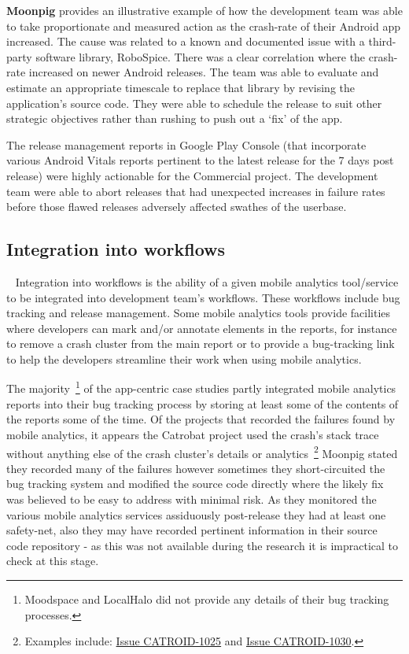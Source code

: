 \textbf{Moonpig} provides an illustrative example of how the development team was able to take proportionate and measured action as the crash-rate of their Android app increased. The cause was related to a known and documented issue with a third-party software library, RoboSpice. There was a clear correlation where the crash-rate increased on newer Android releases. The team was able to evaluate and estimate an appropriate timescale to replace that library by revising the application's source code. They were able to schedule the release to suit other strategic objectives rather than rushing to push out a `fix' of the app.

The release management reports in Google Play Console (that incorporate various Android Vitals reports pertinent to the latest release for the 7 days post release) were highly actionable for the Commercial project. The development team were able to abort releases that had unexpected increases in failure rates before those flawed releases adversely affected swathes of the userbase.

\subsection{Integration into workflows}~\label{section-integration-into-workflows}
Integration into workflows is the ability of a given mobile analytics tool/service to be integrated into development team's workflows. These workflows include bug tracking and release management. Some mobile analytics tools provide facilities where developers can mark and/or annotate elements in the reports, for instance to remove a crash cluster from the main report or to provide a bug-tracking link to help the developers streamline their work when using mobile analytics.

The 
majority~\footnote{Moodspace and LocalHalo did not provide any details of their bug tracking processes.} of the app-centric case studies partly integrated mobile analytics reports into their bug tracking process by storing at least some of the contents of the reports some of the time.  
Of the projects that recorded the failures found by mobile analytics, it appears the Catrobat project used the crash's stack trace without anything else of the crash cluster's details or analytics~\footnote{Examples include: \href{https://jira.catrob.at/browse/CATROID-1025}{Issue CATROID-1025} and \href{https://jira.catrob.at/browse/CATROID-1030}{Issue CATROID-1030}.} Moonpig stated they recorded many of the failures however sometimes they short-circuited the bug tracking system and modified the source code directly where the likely fix was believed to be easy to address with minimal risk. As they monitored the various mobile analytics services assiduously post-release they had at least one safety-net, also they may have recorded pertinent information in their source code repository - as this was not available during the research it is impractical to check at this stage.

